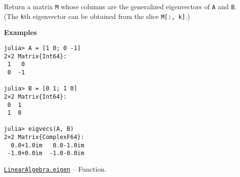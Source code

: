 \begin{adjustwidth}{2em}{0pt}
Return a matrix \texttt{M} whose columns are the generalized eigenvectors of \texttt{A} and \texttt{B}. (The \texttt{k}th eigenvector can be obtained from the slice \texttt{M[:, k]}.)

\textbf{Examples}


\begin{verbatim}
julia> A = [1 0; 0 -1]
2×2 Matrix{Int64}:
 1   0
 0  -1

julia> B = [0 1; 1 0]
2×2 Matrix{Int64}:
 0  1
 1  0

julia> eigvecs(A, B)
2×2 Matrix{ComplexF64}:
  0.0+1.0im   0.0-1.0im
 -1.0+0.0im  -1.0-0.0im
\end{verbatim}



\end{adjustwidth}
\hypertarget{11056016707394839114}{}
\hyperlink{11056016707394839114}{\texttt{LinearAlgebra.eigen}}  -- {Function.}

